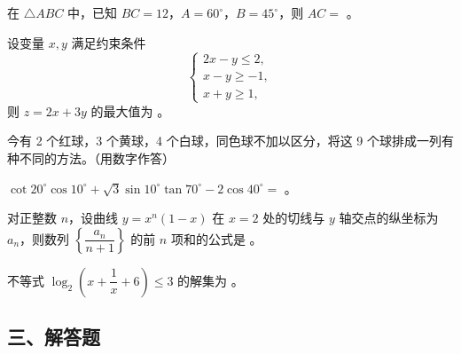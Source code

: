
\begin{question}
在 $\triangle ABC$ 中，已知 $BC=12$，$A=60^\circ$，$B=45^\circ$，则 $AC=$ \gkblank{}。

\end{question}
\begin{question}
设变量 $x,y$ 满足约束条件
\nopagebreak[4]
\[\begin{cases}2x-y\leqslant2,\\x-y\geqslant-1,\\x+y\geqslant1,\end{cases}\]
则 $z=2x+3y$ 的最大值为 \gkblank{}。

\end{question}
\begin{question}
今有 2 个红球，3 个黄球，4 个白球，同色球不加以区分，将这 9 个球排成一列有 \gkblank{} 种不同的方法。（用数字作答）

\end{question}
\begin{question}
$\cot20^\circ\cos10^\circ+\sqrt3\sin10^\circ\tan70^\circ-2\cos40^\circ=$ \gkblank{}。

\end{question}
\begin{question}
对正整数 $n$，设曲线 $y=x^n(1-x)$ 在 $x=2$ 处的切线与 $y$ 轴交点的纵坐标为 $a_n$，则数列 $\left\{\dfrac{a_n}{n+1}\right\}$ 的前 $n$ 项和的公式是 \gkblank{}。

\end{question}
\begin{question}
不等式 $\log_2\left(x+\dfrac1x+6\right)\leqslant3$ 的解集为 \gkblank{}。

\end{question}
\begingroup
\renewcommand{\gkpart}[1]{\Needspace{0.4\textheight}\subsection*{#1}\nopagebreak}
\gkpart{三、解答题}
\endgroup

